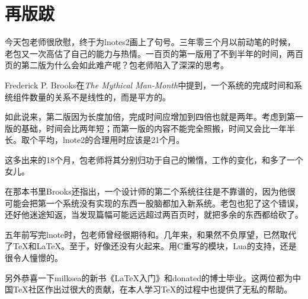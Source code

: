 \chapter{再版跋}

今天包老师很欣慰，终于为lnotes2画上了句号。三年零三个月以前动笔的时候，老包又一次高估了自己的能力与热情。一百页的第一版用了不到半年的时间，两百页的第二版为什么会如此难产呢？包老师陷入了深深的思考。

Frederick P. Brooks在\emph{The Mythical Man-Month}中提到，一个系统的完成时间和系统组件数量的关系不是线性的，而是平方的。

如此说来，第二版因为长度加倍，完成时间应增加到四倍也就是两年。考虑到第一版的基础，时间会比两年短；而第一版的内容不能完全照搬，时间又会比一年半长。取个平均，lnote2的合理用时应该是21个月。

这多出来的18个月，包老师将其分别归功于自己的懒惰，工作的变化，和多了一个女儿。

在那本书里Brooks还指出，一个设计师的第二个系统往往是不靠谱的，因为他很可能会把第一个系统没有实现的东西一股脑都加入新系统。老包也犯了这个错误，还好他迷途知返，当发现篇幅可能远远超过两百页时，就把多余的东西都给砍了。

五年前写完lnote时，包老师曾经很期待\XeTeX{}和\LuaTeX{}。几年来，\XeTeX{}和\XeLaTeX{}果然不负厚望，已然取代了\TeX{}和\LaTeX{}。至于\LuaTeX{}，好像还没有火起来。用C重写的模块，Lua的支持，还是很令人憧憬的。

另外恭喜一下milksea的新书《\LaTeX{}入门》和donated的博士毕业。这两位都为中国\TeX{}社区作出过很大的贡献，在本人学习\TeX{}的过程中也提供了无私的帮助。

\newpage
